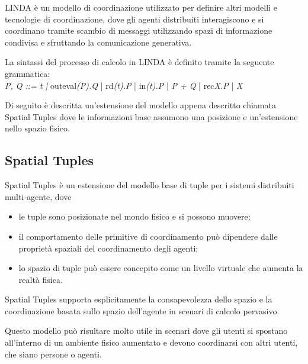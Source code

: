 LINDA \`e un modello di coordinazione utilizzato per definire altri modelli e tecnologie di coordinazione, dove gli agenti distribuiti interagiscono e si coordinano tramite scambio di messaggi utilizzando spazi di informazione condivisa e sfruttando la comunicazione generativa.

La sintassi del processo di calcolo in LINDA \`e definito tramite la seguente grammatica:
\\
\textit{P, Q ::= t |} outeval\textit{(P).Q} | rd\textit{(t).P} | in\textit{(t).P} | \textit{P + Q} | rec\textit{X.P} | \textit{X}

Di seguito \`e descritta un'estensione del modello appena descritto chiamata Spatial Tuples dove le informazioni base assumono una posizione e un'estensione nello spazio fisico.

\subsection{Spatial Tuples}
Spatial Tuples \`e un estensione del modello base di tuple per i sistemi distribuiti multi-agente, dove
\begin{itemize}
\item le tuple sono posizionate nel mondo fisico e si possono muovere;
\item il comportamento delle primitive di coordinamento pu\`o dipendere dalle propriet\`a spaziali del coordinamento degli agenti;
\item lo spazio di tuple pu\`o essere concepito come un livello virtuale che aumenta la realt\`a fisica.
\end{itemize}
Spatial Tuples supporta esplicitamente la consapevolezza dello spazio e la coordinazione basata sullo spazio dell'agente in scenari di calcolo pervasivo.

Questo modello pu\`o risultare molto utile in scenari dove gli utenti si spostano all'interno di un ambiente fisico aumentato e devono coordinarsi con altri utenti, che siano persone o agenti.


